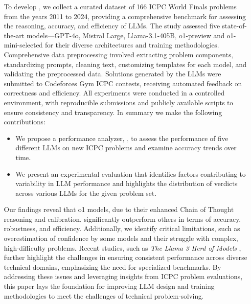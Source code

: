 To develop \Name{}, we collect a curated dataset of 166 ICPC World Finals problems from the years 2011 to 2024, providing a comprehensive benchmark for assessing the reasoning, accuracy, and efficiency of LLMs. The study assessed five state-of-the-art models—GPT-4o, Mistral Large, Llama-3.1-405B, o1-preview and o1-mini-selected for their diverse architectures and training methodologies. Comprehensive data preprocessing involved extracting problem components, standardizing prompts, cleaning text, customizing templates for each model, and validating the preprocessed data. Solutions generated by the LLMs were submitted to Codeforces Gym ICPC contests, receiving automated feedback on correctness and efficiency. All experiments were conducted in a controlled environment, with reproducible submissions and publicly available scripts to ensure consistency and transparency. In summary we make the following contributions:
\begin{itemize}
    \item We propose a performance analyzer, \Name{}, to assess the performance of five different LLMs on new ICPC problems and examine accuracy trends over time.
    \item We present an experimental evaluation that identifies factors contributing to variability in LLM performance and highlights the distribution of verdicts across various LLMs for the given problem set.
\end{itemize}

Our findings reveal that o1 models, due to their enhanced Chain of Thought reasoning and calibration, significantly outperform others in terms of accuracy, robustness, and efficiency. Additionally, we identify critical limitations, such as overestimation of confidence by some models and their struggle with complex, high-difficulty problems. Recent studies, such as \emph{The Llama 3 Herd of Models} \cite{b11}, further highlight the challenges in ensuring consistent performance across diverse technical domains, emphasizing the need for specialized benchmarks. By addressing these issues and leveraging insights from ICPC problem evaluations, this paper lays the foundation for improving LLM design and training methodologies to meet the challenges of technical problem-solving.
